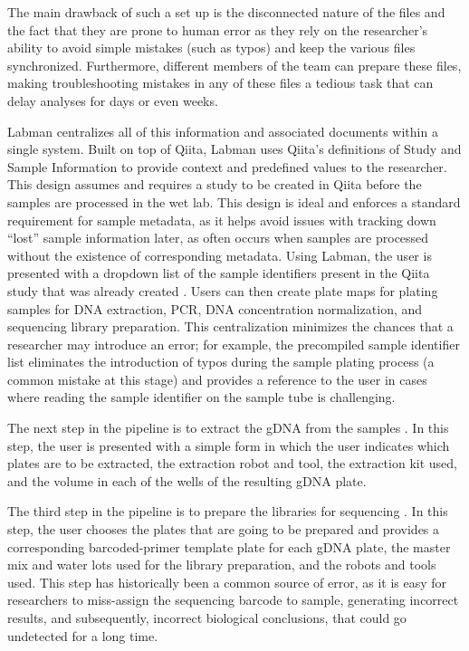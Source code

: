 The main drawback of such a set up is the disconnected nature of the files and
the fact that they are prone to human error as they rely on the researcher’s
ability to avoid simple mistakes (such as typos) and keep the various files
synchronized. Furthermore, different members of the team can prepare these files,
making troubleshooting mistakes in any of these files a tedious task that can
delay analyses for days or even weeks.

Labman centralizes all of this information and associated documents within a
single system. Built on top of Qiita, Labman uses Qiita’s definitions of Study
and Sample Information to provide context and predefined values to the researcher.
This design assumes and requires a study to be created in Qiita before the samples
are processed in the wet lab. This design is ideal and enforces a standard
requirement for sample metadata, as it helps avoid issues with tracking down
“lost” sample information later, as often occurs when samples are processed
without the existence of corresponding metadata. Using Labman, the user is
presented with a dropdown list of the sample identifiers present in the Qiita
study that was already created
. Users can then create plate maps for
plating samples for DNA extraction, PCR, DNA concentration normalization, and
sequencing library preparation. This centralization minimizes the chances that a
researcher may introduce an error; for example, the precompiled sample identifier
list eliminates the introduction of typos during the sample plating process (a
common mistake at this stage) and provides a reference to the user in cases where
reading the sample identifier on the sample tube is challenging.

The next step in the pipeline is to extract the gDNA from the samples
. In this step, the user is presented with a simple form in which the user
indicates which plates are to be extracted, the extraction robot and tool, the
extraction kit used, and the volume in each of the wells of the resulting gDNA
plate.

The third step in the pipeline is to prepare the libraries for sequencing
. In this step, the user chooses the plates that are going to be prepared
and provides a corresponding barcoded-primer template plate for each gDNA plate,
the master mix and water lots used for the library preparation, and the robots
and tools used. This step has historically been a common source of error, as it
is easy for researchers to miss-assign the sequencing barcode to sample,
generating incorrect results, and subsequently, incorrect biological conclusions,
that could go undetected for a long time.


